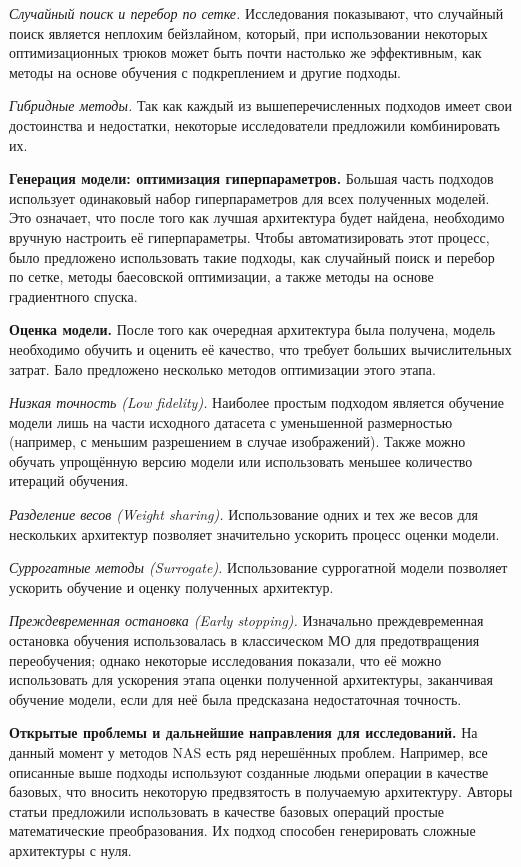 \documentclass[a4paper,14pt]{extarticle}
\begin{document}
    \emph{Случайный поиск и перебор по сетке.}
    Исследования показывают, что случайный поиск является неплохим бейзлайном, который, при использовании некоторых оптимизационных трюков может быть почти настолько же эффективным, как методы на основе обучения с подкреплением и другие подходы.

    \emph{Гибридные методы.}
    Так как каждый из вышеперечисленных подходов имеет свои достоинства и недостатки, некоторые исследователи предложили комбинировать их.

    \textbf{Генерация модели: оптимизация гиперпараметров.}
    Большая часть подходов использует одинаковый набор гиперпараметров для всех полученных моделей.
    Это означает, что после того как лучшая архитектура будет найдена, необходимо вручную настроить её гиперпараметры.
    Чтобы автоматизировать этот процесс, было предложено использовать такие подходы, как случайный поиск и перебор по сетке, методы баесовской оптимизации, а также методы на основе градиентного спуска.

    \textbf{Оценка модели.}
    После того как очередная архитектура была получена, модель необходимо обучить и оценить её качество, что требует больших вычислительных затрат.
    Бало предложено несколько методов оптимизации этого этапа.

    \emph{Низкая точность (Low fidelity).}
    Наиболее простым подходом является обучение модели лишь на части исходного датасета с уменьшенной размерностью (например, с меньшим разрешением в случае изображений).
    Также можно обучать упрощённую версию модели или использовать меньшее количество итераций обучения.

    \emph{Разделение весов (Weight sharing).}
    Использование одних и тех же весов для нескольких архитектур позволяет значительно ускорить процесс оценки модели.

    \emph{Суррогатные методы (Surrogate).}
    Использование суррогатной модели позволяет ускорить обучение и оценку полученных архитектур.

    \emph{Преждевременная остановка (Early stopping).}
    Изначально преждевременная остановка обучения использовалась в классическом МО для предотвращения переобучения; однако некоторые исследования показали, что её можно использовать для ускорения этапа оценки полученной архитектуры, заканчивая обучение модели, если для неё была предсказана недостаточная точность.

    \textbf{Открытые проблемы и дальнейшие направления для исследований.}
    На данный момент у методов NAS есть ряд нерешённых проблем.
    Например, все описанные выше подходы используют созданные людьми операции в качестве базовых, что вносить некоторую предвзятость в получаемую архитектуру.
    Авторы статьи \cite{bibl:az} предложили использовать в качестве базовых операций простые математические преобразования.
    Их подход способен генерировать сложные архитектуры с нуля.
    
\end{document}
